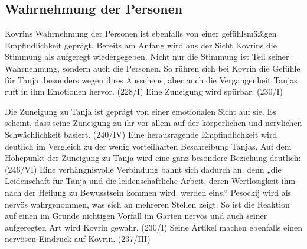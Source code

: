 \documentclass{../../sem_paper}
\begin{document}
\subsection{Wahrnehmung der Personen}
Kovrins Wahrnehmung der Personen ist ebenfalls von einer gefühlsmäßigen Empfindlichkeit geprägt.
Bereits am Anfang wird aus der Sicht Kovrins die Stimmung als aufgeregt wiedergegeben. Nicht
nur die Stimmung ist Teil seiner Wahrnehmung, sondern auch die Personen. So rühren sich bei
Kovrin die Gefühle für Tanja, besonders wegen ihres Aussehens, aber auch die Vergangenheit
Tanjas ruft in ihm Emotionen hervor. (228/I) Eine
Zuneigung wird spürbar: (230/I)

Die Zuneigung zu Tanja ist geprägt von einer emotionalen Sicht auf sie. Es scheint, dass seine
Zuneigung zu ihr vor allem auf der körperlichen und nervlichen Schwächlichkeit basiert. (240/IV) Eine herausragende Empfindlichkeit wird deutlich im Vergleich zu der wenig
vorteilhaften Beschreibung Tanjas. Auf dem Höhepunkt der Zuneigung zu Tanja wird eine ganz
besondere Beziehung deutlich: (246/VI) Eine verhängnisvolle
Verbindung bahnt sich dadurch an, denn „die Leidenschaft für Tanja und die leidenschaftliche
Arbeit, deren Wertlosigkeit ihm nach der Heilung zu Bewusstsein kommen wird, werden eins.“\autocite[96]{freise91}
Pesockij wird als nervös wahrgenommen, was sich an mehreren Stellen zeigt. So ist die Reaktion
auf einen im Grunde nichtigen Vorfall im Garten nervös und auch seiner aufgeregten Art wird
Kovrin gewahr. (230/I) Seine Artikel
machen ebenfalls einen nervösen Eindruck auf Kovrin. (237/III)
\end{document}
